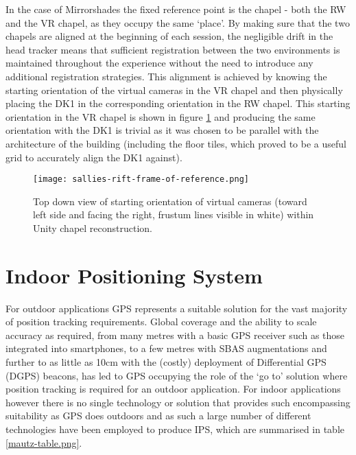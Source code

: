 In the case of Mirrorshades the fixed reference point is the chapel - both the RW and the VR chapel, as they occupy the same `place'. By making sure that the two chapels are aligned at the beginning of each session, the negligible drift in the head tracker means that sufficient registration between the two environments is maintained throughout the experience without the need to introduce any additional registration strategies. This alignment is achieved by knowing the starting orientation of the virtual cameras in the VR chapel and then physically placing the DK1 in the corresponding orientation in the RW chapel. This starting orientation in the VR chapel is shown in figure \ref{sallies-rift-frame-of-reference.png} and producing the same orientation with the DK1 is trivial as it was chosen to be parallel with the architecture of the building (including the floor tiles, which proved to be a useful grid to accurately align the DK1 against).

\begin{figure}
	\begin{center}
		\texttt{[image: sallies-rift-frame-of-reference.png]}
		\caption{Top down view of starting orientation of virtual cameras (toward left side and facing the right, frustum lines visible in white) within Unity chapel reconstruction.}
		\label{sallies-rift-frame-of-reference.png}
	\end{center}
\end{figure}


\section{Indoor Positioning System}

For outdoor applications GPS represents a suitable solution for the vast majority of position tracking requirements. Global coverage and the ability to scale accuracy as required, from many metres with a basic GPS receiver such as those integrated into smartphones, to a few metres with SBAS augmentations and further to as little as 10cm with the (costly) deployment of Differential GPS (DGPS) beacons, has led to GPS occupying the role of the `go to' solution where position tracking is required for an outdoor application. For indoor applications however there is no single technology or solution that provides such encompassing suitability as GPS does outdoors and as such a large number of different technologies have been employed to produce IPS, which are summarised in table \ref{mautz-table.png}.

